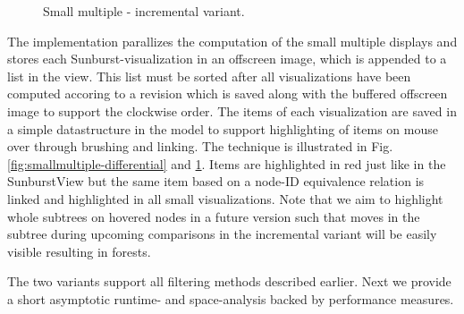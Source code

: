 \begin{itemize}
\begin{figure}[tb]
\caption{\label{fig:smallmultiple-incremental} Small multiple - incremental variant.}
\end{figure}
\end{itemize}

The implementation parallizes the computation of the small multiple displays and stores each Sunburst-visualization in an offscreen image, which is appended to a list in the view. This list must be sorted after all visualizations have been computed accoring to a revision which is saved along with the buffered offscreen image to support the clockwise order. The items of each visualization are saved in a simple datastructure in the model to support highlighting of items on mouse over through brushing and linking. The technique is illustrated in Fig. \ref{fig:smallmultiple-differential} and \ref{fig:smallmultiple-incremental}. Items are highlighted in red just like in the SunburstView but the same item based on a node-ID equivalence relation is linked and highlighted in all small visualizations. Note that we aim to highlight whole subtrees on hovered nodes in a future version such that moves in the subtree during upcoming comparisons in the incremental variant will be easily visible resulting in forests. 

The two variants support all filtering methods described earlier. Next we provide a short asymptotic runtime- and space-analysis backed by performance measures.


